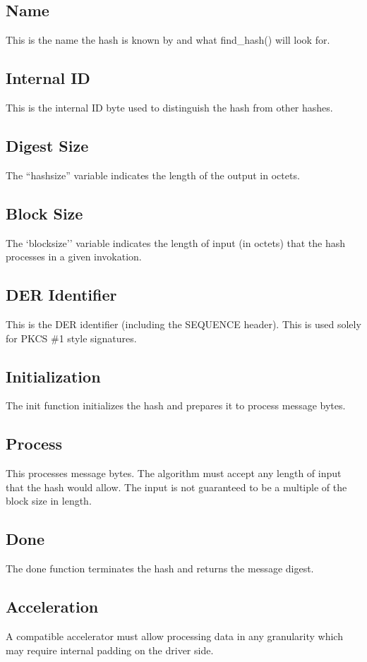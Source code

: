\documentclass[a4paper]{book}
\begin{document}
\subsection{Name}
This is the name the hash is known by and what find\_hash() will look for.

\subsection{Internal ID}
This is the internal ID byte used to distinguish the hash from other hashes.

\subsection{Digest Size}
The ``hashsize'' variable indicates the length of the output in octets.

\subsection{Block Size}
The `blocksize'' variable indicates the length of input (in octets) that the hash processes in a given
invokation.

\subsection{DER Identifier}
This is the DER identifier (including the SEQUENCE header).  This is used solely for PKCS \#1 style signatures.  

\subsection{Initialization}
The init function initializes the hash and prepares it to process message bytes.

\subsection{Process}
This processes message bytes.  The algorithm must accept any length of input that the hash would allow.  The input is not
guaranteed to be a multiple of the block size in length.

\subsection{Done}
The done function terminates the hash and returns the message digest.

\subsection{Acceleration}
A compatible accelerator must allow processing data in any granularity which may require internal padding on the driver side.  
\end{document}

